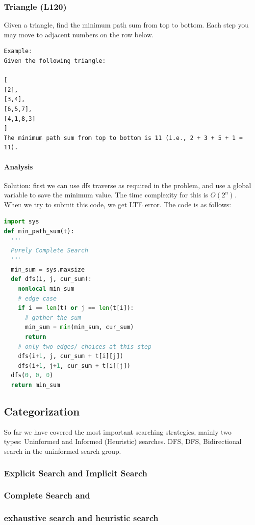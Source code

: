 \documentclass[main.tex]{subfiles}
\begin{document}
\subsubsection{Triangle (L120)} 
Given a triangle, find the minimum path sum from top to bottom. Each step you may move to adjacent numbers on the row below.
\begin{lstlisting}[numbers=none]
Example:
Given the following triangle:

[
[2],
[3,4],
[6,5,7],
[4,1,8,3]
]
The minimum path sum from top to bottom is 11 (i.e., 2 + 3 + 5 + 1 = 11).
\end{lstlisting}

  
\paragraph{Analysis}
Solution: first we can use dfs traverse as required in the problem, and use a global variable to save the minimum value. The time complexity for this is $O(2^n)$. When we try to submit this code, we get LTE error. The code is as follows:
\begin{lstlisting}[language = Python]
import sys
def min_path_sum(t):
  '''
  Purely Complete Search
  '''
  min_sum = sys.maxsize
  def dfs(i, j, cur_sum):
    nonlocal min_sum
    # edge case
    if i == len(t) or j == len(t[i]):
      # gather the sum
      min_sum = min(min_sum, cur_sum)
      return
    # only two edges/ choices at this step
    dfs(i+1, j, cur_sum + t[i][j])
    dfs(i+1, j+1, cur_sum + t[i][j])
  dfs(0, 0, 0)
  return min_sum
\end{lstlisting}





\subsection{Categorization}
So far we have covered the most important searching strategies, mainly two types: Uninformed and Informed (Heuristic) searches. DFS, DFS, Bidirectional search in the uninformed search group. 
\subsubsection{Explicit Search and Implicit Search}
\subsubsection{Complete Search and }
\subsubsection{exhaustive search and heuristic search}
\end{document}
